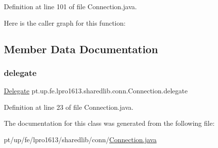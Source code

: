 Definition at line 101 of file Connection.\+java.

Here is the caller graph for this function\+:


\subsection{Member Data Documentation}
\hypertarget{classpt_1_1up_1_1fe_1_1lpro1613_1_1sharedlib_1_1conn_1_1_connection_ad0181759fff34ee0320a29111462ef94}{}\label{classpt_1_1up_1_1fe_1_1lpro1613_1_1sharedlib_1_1conn_1_1_connection_ad0181759fff34ee0320a29111462ef94} 
\subsubsection{\texorpdfstring{delegate}{delegate}}
{\footnotesize\ttfamily \hyperlink{interfacept_1_1up_1_1fe_1_1lpro1613_1_1sharedlib_1_1conn_1_1_connection_1_1_delegate}{Delegate} pt.\+up.\+fe.\+lpro1613.\+sharedlib.\+conn.\+Connection.\+delegate}



Definition at line 23 of file Connection.\+java.



The documentation for this class was generated from the following file\+:\begin{DoxyCompactItemize}
\item 
pt/up/fe/lpro1613/sharedlib/conn/\hyperlink{_connection_8java}{Connection.\+java}\end{DoxyCompactItemize}
